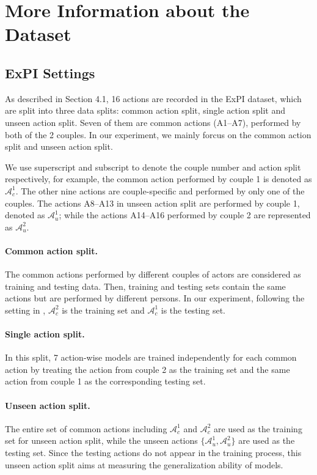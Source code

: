 \documentclass[10pt,twocolumn,letterpaper]{article}
\begin{document}
\section{More Information about the Dataset}
\label{app_sec:dataset}
\subsection{ExPI Settings}
As described in Section 4.1, 16 actions are recorded in the ExPI dataset, which are split into three data splits: common action split, single action split and unseen action split.
Seven of them are common actions (A1--A7), performed by both of the 2 couples. 
In our experiment, we mainly forcus on the common action split and unseen action split. 

We use superscript and subscript to denote the couple number and action split respectively, for example, the common action performed by couple 1 is denoted as $\mathcal{A}_c^1$.
The other nine actions are couple-specific and performed by only one of the couples.
The actions A8--A13 in unseen action split are performed by couple 1, denoted as $\mathcal{A}_u^1$; while the actions A14--A16 performed by couple 2 are represented as $\mathcal{A}_u^2$. 

\paragraph{Common action split.}
The common actions performed by different couples of actors are considered as training and testing data.
Then, training and testing sets contain the same actions but are performed by different persons.
In our experiment, following the setting in \cite{guo2021multi}, $\mathcal{A}_c^2$ is the training set and $\mathcal{A}_c^1$ is the testing set.

\paragraph{Single action split.}
In this split, 7 action-wise models are trained independently for each common action by treating the action from couple 2 as the training set and the same action from couple 1 as the corresponding testing set.

\paragraph{Unseen action split.}
The entire set of common actions including $\mathcal{A}_c^1$ and $\mathcal{A}_c^2$ are used as the training set for unseen action split, while the unseen actions $\{\mathcal{A}_u^1, \mathcal{A}_u^2\}$ are used as the testing set.
Since the testing actions do not appear in the training process, this unseen action split aims at measuring the generalization ability of models.
\end{document}
